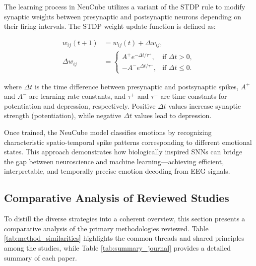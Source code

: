 \documentclass[conference]{IEEEtran}
\begin{document}
The learning process in NeuCube utilizes a variant of the STDP rule to modify synaptic weights between presynaptic and postsynaptic neurons depending on their firing intervals. The STDP weight update function is defined as:

\begin{equation}
\begin{aligned}
w_{ij}(t + 1) &= w_{ij}(t) + \Delta w_{ij}, \\
\Delta w_{ij} &=
\begin{cases}
A^+ e^{-\Delta t / \tau^+}, & \text{if } \Delta t > 0, \\
-A^- e^{\Delta t / \tau^-}, & \text{if } \Delta t \leq 0.
\end{cases}
\end{aligned}
\end{equation}

where \(\Delta t\) is the time difference between presynaptic and postsynaptic spikes, \(A^+\) and \(A^-\) are learning rate constants, and \(\tau^+\) and \(\tau^-\) are time constants for potentiation and depression, respectively. Positive \(\Delta t\) values increase synaptic strength (potentiation), while negative \(\Delta t\) values lead to depression.

Once trained, the NeuCube model classifies emotions by recognizing characteristic spatio-temporal spike patterns corresponding to different emotional states. This approach demonstrates how biologically inspired SNNs can bridge the gap between neuroscience and machine learning—achieving efficient, interpretable, and temporally precise emotion decoding from EEG signals.


\subsection{Comparative Analysis of Reviewed Studies}
To distill the diverse strategies into a coherent overview, this section presents a comparative analysis of the primary methodologies reviewed. Table \ref{tab:method_similarities} highlights the common threads and shared principles among the studies, while Table \ref{tab:summary_journal} provides a detailed summary of each paper.
\end{document}
